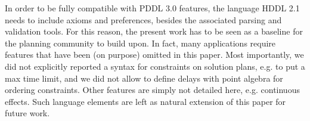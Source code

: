\documentclass[letterpaper]{article} %
\begin{document}
In order to be fully compatible with PDDL 3.0 features, the language HDDL 2.1 needs to include axioms and preferences, besides the associated parsing and validation tools. For this reason, the present work has to be seen as a baseline for the planning community to build upon.
In fact, many applications require features that have been (on purpose) omitted in this paper. Most importantly, we did not explicitly reported a syntax for constraints on solution plans, e.g. to put a max time limit, and we did not allow to define delays  with point algebra for ordering constraints. Other features are simply not detailed here, e.g. continuous effects.
Such language elements are left as natural extension of this paper for future work.




\end{document}
